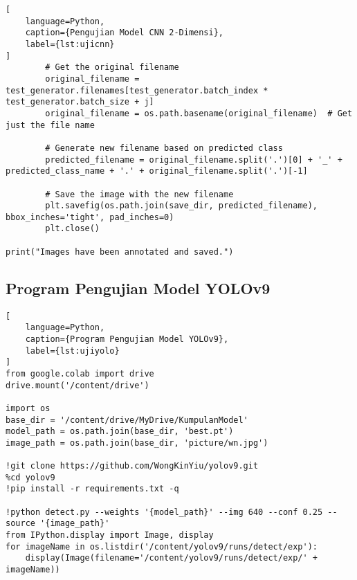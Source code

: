 \begin{lstlisting}[
    language=Python,
    caption={Pengujian Model CNN 2-Dimensi},
    label={lst:ujicnn}
]
        # Get the original filename
        original_filename = test_generator.filenames[test_generator.batch_index * test_generator.batch_size + j]
        original_filename = os.path.basename(original_filename)  # Get just the file name

        # Generate new filename based on predicted class
        predicted_filename = original_filename.split('.')[0] + '_' + predicted_class_name + '.' + original_filename.split('.')[-1]

        # Save the image with the new filename
        plt.savefig(os.path.join(save_dir, predicted_filename), bbox_inches='tight', pad_inches=0)
        plt.close()

print("Images have been annotated and saved.")
\end{lstlisting}

\subsection*{Program Pengujian Model YOLOv9}
\begin{lstlisting}[
    language=Python,
    caption={Program Pengujian Model YOLOv9},
    label={lst:ujiyolo}
]
from google.colab import drive
drive.mount('/content/drive')

import os
base_dir = '/content/drive/MyDrive/KumpulanModel'
model_path = os.path.join(base_dir, 'best.pt')
image_path = os.path.join(base_dir, 'picture/wn.jpg')

!git clone https://github.com/WongKinYiu/yolov9.git
%cd yolov9
!pip install -r requirements.txt -q

!python detect.py --weights '{model_path}' --img 640 --conf 0.25 --source '{image_path}'
from IPython.display import Image, display
for imageName in os.listdir('/content/yolov9/runs/detect/exp'):
    display(Image(filename='/content/yolov9/runs/detect/exp/' + imageName))
\end{lstlisting}
